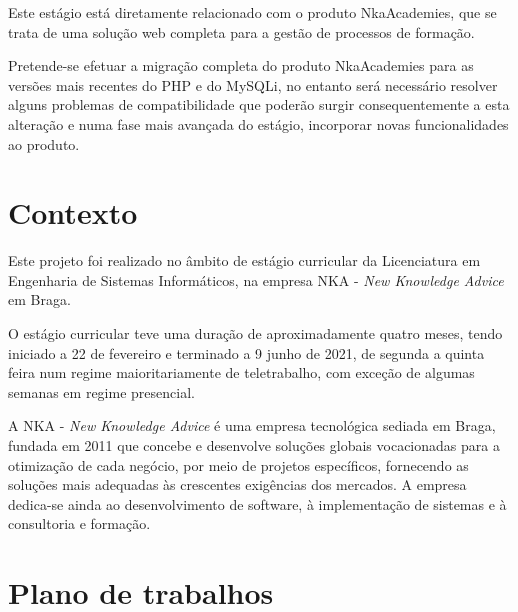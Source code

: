 Este estágio está diretamente relacionado com o produto NkaAcademies, que se trata de uma solução web completa para a gestão de processos de formação.


Pretende-se efetuar a migração completa do produto NkaAcademies para as versões mais recentes do PHP e do MySQLi, no entanto será necessário resolver alguns problemas de compatibilidade que poderão surgir consequentemente a esta alteração e numa fase mais avançada do estágio, incorporar novas funcionalidades ao produto.


\section{Contexto}
\par Este projeto foi realizado no âmbito de estágio curricular da Licenciatura em Engenharia de Sistemas Informáticos, na empresa NKA - \textit{New Knowledge Advice} em Braga.
\par O estágio curricular teve uma duração de aproximadamente quatro meses, tendo iniciado a 22 de fevereiro e terminado a 9 junho de 2021, de segunda a quinta feira num regime maioritariamente de teletrabalho, com exceção de algumas semanas em regime presencial.
\par A NKA - \textit{New Knowledge Advice} é uma empresa tecnológica sediada em Braga, fundada em 2011 que concebe e desenvolve soluções globais vocacionadas para a otimização de cada negócio, por meio de projetos específicos, fornecendo as soluções mais adequadas às crescentes exigências dos mercados. A empresa dedica-se ainda ao desenvolvimento de software, à implementação de sistemas e à consultoria e formação\citep{nka}.

\section{Plano de trabalhos}

